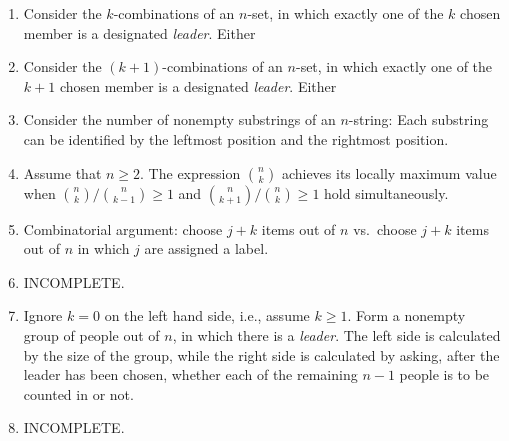 \begin{enumerate}[\thesection-1]
Note that the number of nonempty substrings is equal to ${n + 1 \choose 2}$, and it can be ``explained'' by this counting argument: Every nonempty substring can be identified by the smallest and the greatest positions, namely two (not necessarily distinct) numbers $i$ and $j$ from the set $\sete{1, \etl, n}$; the total number of combinations of $i$ and $j$ is equal to the number of $2$-combinations of the set $\sete{1, \etl, n, \mbox{``duplicate''}}$, where $\sete{k, \mbox{``duplicate''}}$ is interpreted as $i = j = k$.
%
\setcounter{enumi}{4}
%
\item Consider the $k$-combinations of an $n$-set, in which exactly one of the $k$ chosen member is a designated \emph{leader}. Either
%
\item Consider the $(k + 1)$-combinations of an $n$-set, in which exactly one of the $k + 1$ chosen member is a designated \emph{leader}. Either
%
\setcounter{enumi}{8}
%
\item Consider the number of nonempty substrings of an $n$-string: Each substring can be identified by the leftmost position and the rightmost position.
%
\item Assume that $n \geq 2$. The expression ${n \choose k}$ achieves its locally maximum value when ${n \choose k} / {n \choose k - 1} \geq 1$ and ${n \choose k + 1} / {n \choose k} \geq 1$ hold simultaneously.
%
\item Combinatorial argument: choose $j + k$ items out of $n$ vs.~choose $j + k$ items out of $n$ in which $j$ are assigned a label.
%
\item INCOMPLETE.
%
\setcounter{enumi}{14}
%
\item Ignore $k = 0$ on the left hand side, i.e., assume $k \geq 1$. Form a nonempty group of people out of $n$, in which there is a \emph{leader}. The left side is calculated by the size of the group, while the right side is calculated by asking, after the leader has been chosen, whether each of the remaining $n - 1$ people is to be counted in or not.
%
\item INCOMPLETE.
%
\end{enumerate}

